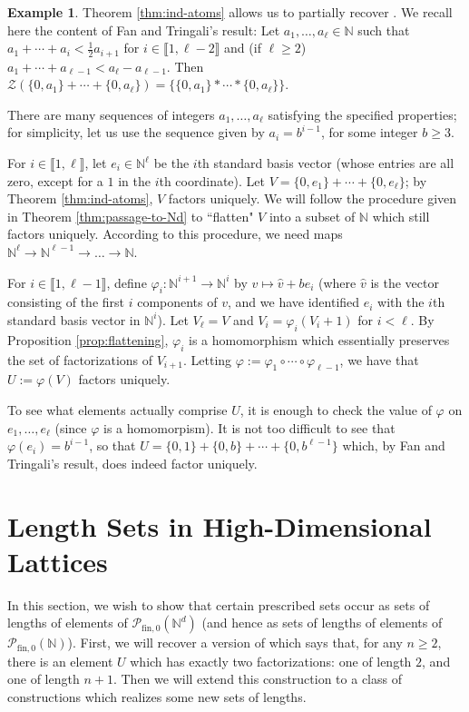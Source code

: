 \documentclass{report}
\newcommand{\NN}{\mathbb{N}}
\renewcommand{\P}{\mathcal{P}}
\newcommand{\Z}{\mathcal{Z}}
\newcommand{\llb}{\llbracket}
\newcommand{\rrb}{\rrbracket}
\newcommand{\fin}{\textrm{fin}}
\newcommand{\fon}{{\textrm{fin}, 0}}
\renewcommand{\:}{\text{:}}
\newcommand{\PN}{{\P_{\fin,0}(\NN)}}
\theoremstyle{definition}
\newtheorem{eg}[defn]{Example}
\begin{document}
\begin{eg} \label{eg:recover-flat-unique-fac}
Theorem \ref{thm:ind-atoms} allows us to partially recover \cite[Proposition 4.9]{fan-tringali18}.
We recall here the content of Fan and Tringali's result: Let $a_1,\dots, a_\ell \in \NN$ such that $a_1 + \cdots + a_i < \frac{1}{2} a_{i+1}$ for $i\in \llb 1,\ell-2 \rrb$ and (if $\ell \ge 2$) $a_1+\cdots + a_{\ell-1} < a_\ell - a_{\ell-1}$.
Then $\Z(\{0,a_1\}+\cdots+\{0,a_\ell\}) = \{ \{0,a_1\}*\cdots*\{0,a_\ell\}\}$.

There are many sequences of integers $a_1,\dots,a_\ell$ satisfying the specified properties; for simplicity, let us use the sequence given by $a_i = b^{i-1}$, for some integer $b \ge 3$.

For $i\in \llb 1,\ell \rrb$, let $e_i \in \NN^\ell$ be the $i$th standard basis vector (whose entries are all zero, except for a $1$ in the $i$th coordinate).
Let $V = \{0,e_1\} + \cdots + \{0,e_\ell\}$; by Theorem \ref{thm:ind-atoms}, $V$ factors uniquely.
We will follow the procedure given in Theorem \ref{thm:passage-to-Nd} to ``flatten" $V$ into a subset of $\NN$ which still factors uniquely.
According to this procedure, we need maps $\NN^\ell \to \NN^{\ell-1} \to \dots \to \NN$.

For $i\in \llb 1,\ell-1 \rrb$, define $\varphi_i: \NN^{i+1} \to \NN^{i}$ by $v \mapsto \hat{v} + be_{i}$ (where $\hat{v}$ is the vector consisting of the first $i$ components of $v$, and we have identified $e_i$ with the $i$th standard basis vector in $\NN^i$).
Let $V_\ell = V$ and $V_i = \varphi_i(V_i+1)$ for $i <\ell$.
By Proposition \ref{prop:flattening}, $\varphi_i$ is a homomorphism which essentially preserves the set of factorizations of $V_{i+1}$.
Letting $\varphi := \varphi_1\circ \cdots \circ \varphi_{\ell-1}$, we have that $U := \varphi(V)$ factors uniquely.

To see what elements actually comprise $U$, it is enough to check the value of $\varphi$ on $e_1,\dots, e_\ell$ (since $\varphi$ is a homomorpism).
It is not too difficult to see that $\varphi(e_i) = b^{i-1}$, so that $U = \{0,1\}+\{0,b\}+\cdots+\{0,b^{\ell-1}\}$ which, by Fan and Tringali's result, does indeed factor uniquely.
\end{eg}

\section{Length Sets in High-Dimensional Lattices}
In this section, we wish to show that certain prescribed sets occur as sets of lengths of elements of $\P_\fon(\NN^d)$ (and hence as sets of lengths of elements of $\PN$).
First, we will recover a version of \cite[Proposition 4.10]{fan-tringali18} which says that, for any $n\ge 2$, there is an element $U$ which has exactly two factorizations: one of length $2$, and one of length $n+1$.
Then we will extend this construction to a class of constructions which realizes some new sets of lengths.
\end{document}
